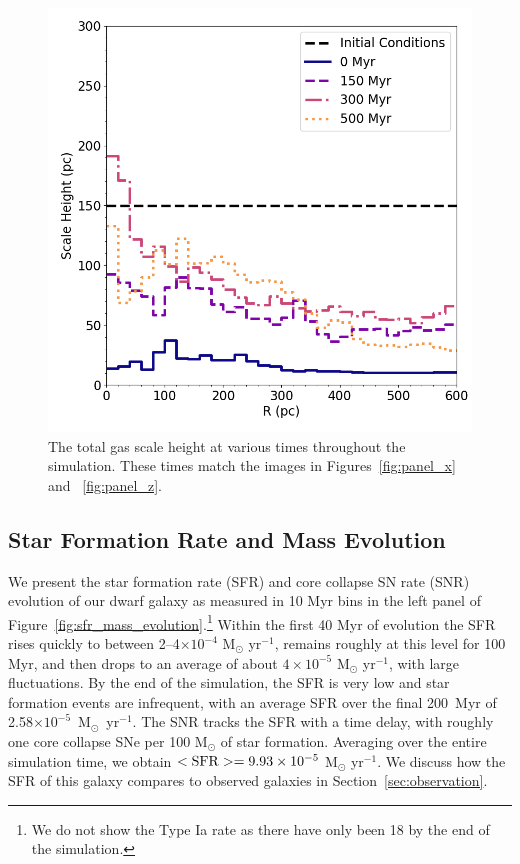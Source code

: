 \documentclass[twocolumn]{aastex61}
\begin{document}
\begin{figure}
\centering
\includegraphics[width=0.975\linewidth]{scale_height}
\caption{The total gas scale height at various times throughout the simulation. These times match the images in Figures~\ref{fig:panel_x} and ~\ref{fig:panel_z}.}
\label{fig:scale_height}
\end{figure}

\subsection{Star Formation Rate and Mass Evolution}
\label{sec:sfr}

We present the star formation rate (SFR) and core collapse SN rate (SNR) evolution of our dwarf galaxy as measured in 10 Myr bins in the left panel of Figure~\ref{fig:sfr_mass_evolution}.\footnote{We do not show the Type Ia rate as there have only been 18 by the end of the simulation.} Within the first 40 Myr of evolution the SFR rises quickly to between 2--4$ \times 10^{-4}$ M$_{\odot}$ yr$^{-1}$, remains roughly at this level for 100 Myr, and then drops to an average of about $4 \times 10^{-5}$ M$_{\odot}$ yr$^{-1}$, with large fluctuations. By the end of the simulation, the SFR is very low and star formation events are infrequent, with an average SFR over the final 200~Myr of 2.58$\times 10^{-5}$~M$_{\odot}$~yr$^{-1}$. The SNR tracks the SFR with a time delay, with roughly one core collapse SNe per 100 M$_{\odot}$ of star formation. Averaging over the entire simulation time, we obtain  $<\rm{SFR}> = 9.93 \times 10^{-5}$ M$_{\odot}$ yr$^{-1}$. We discuss how the SFR of this galaxy compares to observed galaxies in Section~\ref{sec:observation}.
\end{document}
